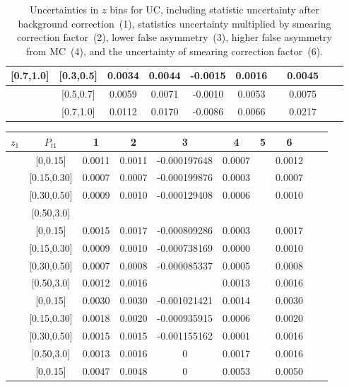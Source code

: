 \begin{table}[H]
\begin{tabular}{|c| c| c| c| c| c| c| c| c| c|}
[0.7,1.0]	&	[0.3,0.5]	&	0.0034	&	0.0044	&	-0.0015	&	0.0016	&		&	0.0045	\\ \hline
[0.7,1.0]	&	[0.5,0.7]	&	0.0059	&	0.0071	&	-0.0010	&	0.0053	&		&	0.0075	\\ \hline
[0.7,1.0]	&	[0.7,1.0]	&	0.0112	&	0.0170	&	-0.0086	&	0.0066	&		&	0.0217	\\ \hline
\end{tabular}
\caption{Uncertainties in $z$ bins for UC, including statistic uncertainty after background correction~(1), statistics uncertainty multiplied by smearing correction factor~(2), lower false asymmetry~(3), higher false asymmetry from MC~(4), and the uncertainty of smearing correction factor~(6).}
\label{tab:ucerrors_z}
\end{table}
\begin{table}[H]\scriptsize
\centering
\begin{tabular}{|c| c| c| c| c| c| c| c| c| c|}
\hline
$z_1$ & $P_{t1}$ & 1 & 2 & 3 & 4& 5& 6 \\ \hline
[0.2,0.3]	&	[0,0.15]	&	0.0011	&	0.0011	&	-0.000197648	&	0.0007	&		&	0.0012	\\ \hline
[0.2,0.3]	&	[0.15,0.30]	&	0.0007	&	0.0007	&	-0.000199876	&	0.0003	&		&	0.0007	\\ \hline
[0.2,0.3]	&	[0.30,0.50]	&	0.0009	&	0.0010	&	-0.000129408	&	0.0006	&		&	0.0010	\\ \hline
[0.2,0.3]	&	[0.50,3.0]	&		&		&		&		&		&		\\ \hline
[0.3,0.5]	&	[0,0.15]	&	0.0015	&	0.0017	&	-0.000809286	&	0.0003	&		&	0.0017	\\ \hline
[0.3,0.5]	&	[0.15,0.30]	&	0.0009	&	0.0010	&	-0.000738169	&	0.0000	&		&	0.0010	\\ \hline
[0.3,0.5]	&	[0.30,0.50]	&	0.0007	&	0.0008	&	-0.000085337	&	0.0005	&		&	0.0008	\\ \hline
[0.3,0.5]	&	[0.50,3.0]	&	0.0012	&	0.0016	&		&	0.0013	&		&	0.0016	\\ \hline
[0.5,0.7]	&	[0,0.15]	&	0.0030	&	0.0030	&	-0.001021421	&	0.0014	&		&	0.0030	\\ \hline
[0.5,0.7]	&	[0.15,0.30]	&	0.0018	&	0.0020	&	-0.000935915	&	0.0006	&		&	0.0020	\\ \hline
[0.5,0.7]	&	[0.30,0.50]	&	0.0015	&	0.0015	&	-0.001155162	&	0.0001	&		&	0.0016	\\ \hline
[0.5,0.7]	&	[0.50,3.0]	&	0.0013	&	0.0016	&	0	&	0.0017	&		&	0.0016	\\ \hline
[0.7,1.0]	&	[0,0.15]	&	0.0047	&	0.0048	&	0	&	0.0053	&		&	0.0050	\\ \hline

\end{tabular}
\end{table}
